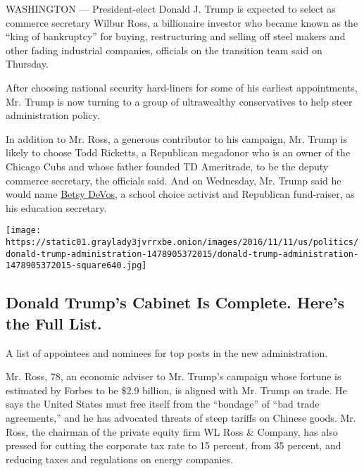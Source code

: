 WASHINGTON --- President-elect Donald J. Trump is expected to select as
commerce secretary Wilbur Ross, a billionaire investor who became known
as the ``king of bankruptcy'' for buying, restructuring and selling off
steel makers and other fading industrial companies, officials on the
transition team said on Thursday.

After choosing national security hard-liners for some of his earliest
appointments, Mr. Trump is now turning to a group of ultrawealthy
conservatives to help steer administration policy.

In addition to Mr. Ross, a generous contributor to his campaign, Mr.
Trump is likely to choose Todd Ricketts, a Republican megadonor who is
an owner of the Chicago Cubs and whose father founded TD Ameritrade, to
be the deputy commerce secretary, the officials said. And on Wednesday,
Mr. Trump said he would name
\href{http://www.nytimes3xbfgragh.onion/2016/11/23/us/politics/betsy-devos-trumps-education-pick-has-steered-money-from-public-schools.html}{Betsy
DeVos}, a school choice activist and Republican fund-raiser, as his
education secretary.

\href{https://www.nytimes3xbfgragh.onion/interactive/2016/us/politics/donald-trump-administration.html}{}

\texttt{[image: https://static01.graylady3jvrrxbe.onion/images/2016/11/11/us/politics/donald-trump-administration-1478905372015/donald-trump-administration-1478905372015-square640.jpg]}

\hypertarget{donald-trumps-cabinet-is-complete-heres-the-full-list}{%
\subsection{Donald Trump's Cabinet Is Complete. Here's the Full
List.}\label{donald-trumps-cabinet-is-complete-heres-the-full-list}}

A list of appointees and nominees for top posts in the new
administration.

Mr. Ross, 78, an economic adviser to Mr. Trump's campaign whose fortune
is estimated by Forbes to be \$2.9 billion, is aligned with Mr. Trump on
trade. He says the United States must free itself from the ``bondage''
of ``bad trade agreements,'' and he has advocated threats of steep
tariffs on Chinese goods. Mr. Ross, the chairman of the private equity
firm WL Ross \& Company, has also pressed for cutting the corporate tax
rate to 15 percent, from 35 percent, and reducing taxes and regulations
on energy companies.


